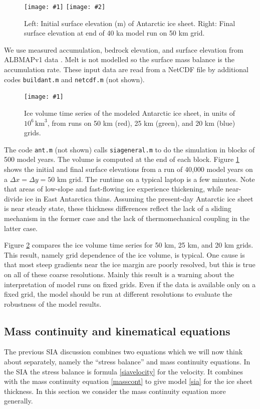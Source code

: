 \documentclass[titlepage,a4paper,final,12pt]{scrartcl}
\newcommand{\onefigsize}[3]{
\begin{figure}[ht]
\centering
\texttt{[image: \#1]}
\caption{#2}
\label{fig:#1}
\end{figure}}
\newcommand{\onefig}[2]{\onefigsize{#1}{#2}{3.0in}}
\newcommand{\twofigsizes}[5]{
\begin{figure}[ht]
\centering
\texttt{[image: \#1]} \quad
\texttt{[image: \#2]}
\caption{#3}
\label{fig:#1}
\end{figure}}
\begin{document}
\twofigsizes{antinitial}{antfinal}{Left: Initial surface elevation (m) of Antarctic ice sheet.  Right: Final surface elevation at end of 40 ka model run on 50 km grid.}{2.55in}{3.2in}

We use measured accumulation, bedrock elevation, and surface elevation from ALBMAPv1 data \cite{LeBrocqetal2010}.  Melt is not modelled so the surface mass balance is the accumulation rate.  These input data are read from a NetCDF file by additional codes \texttt{buildant.m} and \texttt{netcdf.m} (not shown).

\onefig{antvolcompare}{Ice volume time series of the modeled Antarctic ice sheet, in units of $10^6 \, \text{km}^3$, from runs on 50 km (red), 25 km (green), and 20 km (blue) grids.}

The code \texttt{ant.m} (not shown) calls \texttt{siageneral.m} to do the simulation in blocks of 500 model years.  The volume is computed at the end of each block.  Figure \ref{fig:antinitial} shows the initial and final surface elevations from a run of 40,000 model years on a $\Delta x = \Delta y = 50$ km grid.  The runtime on a typical laptop is a few minutes.  Note that areas of low-slope and fast-flowing ice experience thickening, while near-divide ice in East Antarctica thins.  Assuming the present-day Antarctic ice sheet is near steady state, these thickness differences reflect the lack of a sliding mechanism in the former case and the lack of thermomechanical coupling in the latter case.

Figure \ref{fig:antvolcompare} compares the ice volume time series for 50 km, 25 km, and 20 km grids.  This result, namely grid dependence of the ice volume, is typical.  One cause is that most steep gradients near the ice margin are poorly resolved, but this is true on all of these coarse resolutions.  Mainly this result is a warning about the interpretation of model runs on fixed grids.  Even if the data is available only on a fixed grid, the model should be run at different resolutions to evaluate the robustness of the model results.


\subsection{Mass continuity and kinematical equations}

The previous SIA discussion combines two equations which we will now think about separately, namely the ``stress balance'' and mass continuity equations.  In the SIA the stress balance is formula \eqref{siavelocity} for the velocity.  It combines with the mass continuity equation \eqref{masscont} to give model \eqref{sia} for the ice sheet thickness.  In this section we consider the mass continuity equation more generally.
\end{document}
